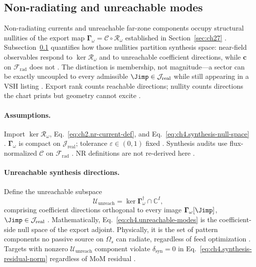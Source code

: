 ﻿\subsection{Non-radiating and unreachable modes}
\label{sec:ch471}

Non-radiating currents and unreachable far-zone components occupy structural nullities of the export map
\(\boldsymbol{\Gamma}_\omega=\mathcal{C}\circ\mathcal{R}_\omega\) established in Section~\ref{sec:ch27} \cite{stratton1941,harrington2001}.
Subsection~\ref{sec:ch471} quantifies how those nullities partition synthesis space: near-field observables respond to
\(\ker\mathcal{R}_\omega\) and to unreachable coefficient directions, while \(\mathbf{c}\) on \(\mathcal{F}_{\mathrm{rad}}\) does not
\cite{devaney2004,hansen1988}. The distinction is membership, not magnitude---a sector can be exactly uncoupled to every admissible
\(\Jimp\in\mathcal{J}_{\mathrm{real}}\) while still appearing in a VSH listing \cite{stratton1941,harrington2001}. Export rank counts
reachable directions; nullity counts directions the chart prints but geometry cannot excite \cite{hansen1988,devaney2004}.

\paragraph{Assumptions.}
Import \(\ker\mathcal{R}_\omega\), Eq.~\eqref{eq:ch2.nr-current-def}, and Eq.~\eqref{eq:ch4.synthesis-null-space} \cite{stratton1941,harrington2001}.
\(\boldsymbol{\Gamma}_\omega\) is compact on \(\mathcal{J}_{\mathrm{real}}\); tolerance \(\varepsilon\in(0,1)\) fixed \cite{devaney2004,hansen1988}.
Synthesis audits use flux-normalized \(\mathcal{C}\) on \(\mathcal{F}_{\mathrm{rad}}\) \cite{hansen1988}. NR definitions are not re-derived here
\cite{stratton1941,harrington2001}.

\paragraph{Unreachable synthesis directions.}
Define the unreachable subspace
\begin{equation}
\label{eq:ch4.unreachable-modes}
\mathcal{U}_{\mathrm{unreach}}=\ker\boldsymbol{\Gamma}_\omega^{\dagger}\cap\mathbb{C}^{I},
\end{equation}
comprising coefficient directions orthogonal to every image \(\boldsymbol{\Gamma}_\omega[\Jimp]\), \(\Jimp\in\mathcal{J}_{\mathrm{real}}\)
\cite{stratton1941,harrington2001,devaney2004}. Mathematically, Eq.~\eqref{eq:ch4.unreachable-modes} is the coefficient-side null space of the
export adjoint. Physically, it is the set of pattern components no passive source on \(\Omega_{s}\) can radiate, regardless of feed optimization
\cite{hansen1988,harrington2001}. Targets with nonzero \(\mathcal{U}_{\mathrm{unreach}}\) component violate \(\delta_{\mathrm{syn}}=0\) in
Eq.~\eqref{eq:ch4.synthesis-residual-norm} regardless of MoM residual \cite{devaney2004}.

